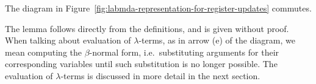 \begin{lemma}
    The diagram in Figure~\ref{fig:labmda-representation-for-register-updates} commutes.
\end{lemma}

The lemma follows  directly from the definitions, and is given without proof. When talking about evaluation of $\lambda$-terms, as in arrow (e) of the diagram, we mean computing the $\beta$-normal form, i.e.~substituting arguments for their corresponding variables until such substitution is no longer possible. The evaluation of $\lambda$-terms is  discussed in more detail in the next section. 




